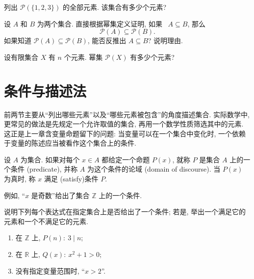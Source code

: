 \documentclass[usesamecnt, thmcnt=section, lang=cn, newtx, 10pt, scheme=chinese]{elegantbook}
\begin{document}
\begin{exercise}\label{ex:sets-powerset-01}
列出 $\mathscr P(\{1,2,3\})$ 的全部元素. 该集合有多少个元素?
\end{exercise}

\begin{exercise}\label{ex:sets-powerset-02}
设 $A$ 和 $B$ 为两个集合. 直接根据幂集定义证明, 如果~ $A\subseteq B$, 那么
\[
 \mathscr P(A)\subseteq\mathscr P(B).
\]
如果知道 $\mathscr P(A)\subseteq\mathscr P(B)$, 能否反推出 $A\subseteq B$? 说明理由.
\end{exercise}

\begin{challenge}\label{ch:sets-01}
设有限集合 $X$ 有 $n$ 个元素. 幂集 $\mathscr P(X)$ 有多少个元素? %
\end{challenge}

\section{条件与描述法}

前两节主要从``列出哪些元素''以及``哪些元素被包含''的角度描述集合. 实际数学中, 更常见的做法是先规定一个允许取值的集合, 再用一个数学性质筛选其中的元素. 这正是上一章含变量命题留下的问题: 当变量可以在一个集合中变化时, 一个依赖于变量的陈述应当被看作这个集合上的条件.

\begin{definition}[集合上的条件]\label{def:sets-condition}
设 $A$ 为集合. 如果对每个 $x\in A$ 都给定一个命题 $P(x)$, 就称 $P$ 是集合 $A$ 上的一个{\color{blue}条件 (predicate)}, 并称 $A$ 为这个条件的{\color{blue}论域 (domain of discourse)}. 当 $P(x)$ 为真时, 称 $x$ {\color{blue}满足 (satisfy)}条件 $P$.

例如, ``$x$ 是奇数''给出了集合 $\mathbb Z$ 上的一个条件.
\end{definition}

\begin{concept}\label{con:sets-06}
说明下列每个表达式在指定集合上是否给出了一个条件; 若是, 举出一个满足它的元素和一个不满足它的元素.
\begin{enumerate}[label=\rm(\arabic*)]
  \item 在 $\mathbb Z$ 上, $P(n):\ 3\mid n$;
  \item 在 $\mathbb R$ 上, $Q(x):\ x^2+1>0$;
  \item 没有指定变量范围时, ``$x>2$''.
\end{enumerate}
\end{concept}
\end{document}
